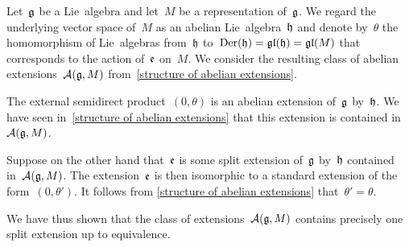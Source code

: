 \begin{remark}
	\label{each class of abelian extensions contains precisely one split extension}
	Let~$\mathfrak{g}$ be a Lie~algebra and let~$M$ be a representation of~$\mathfrak{g}$.
	We regard the underlying vector space of~$M$ as an abelian Lie~algebra~$\mathfrak{h}$ and denote by~$\theta$ the homomorphism of Lie~algebras from~$\mathfrak{h}$ to~$\operatorname{Der}(\mathfrak{h}) = \mathfrak{gl}(\mathfrak{h}) = \mathfrak{gl}(M)$ that corresponds to the action of~$\mathfrak{e}$ on~$M$.
	We consider the resulting class of abelian extensions~$\mathcal{A}(\mathfrak{g}, M)$ from~\cref{structure of abelian extensions}.

	The external semidirect product~$(0,\theta)$ is an abelian extension of~$\mathfrak{g}$ by~$\mathfrak{h}$.
	We have seen in~\cref{structure of abelian extensions} that this extension is contained in~$\mathcal{A}(\mathfrak{g}, M)$.

	Suppose on the other hand that~$\mathfrak{e}$ is some split extension of~$\mathfrak{g}$ by~$\mathfrak{h}$ contained in~$\mathcal{A}(\mathfrak{g}, M)$.
	The extension~$\mathfrak{e}$ is then isomorphic to a standard extension of the form~$(0, \theta')$.
	It follows from \cref{structure of abelian extensions} that~$\theta' = \theta$.

	We have thus shown that the class of extensions~$\mathcal{A}(\mathfrak{g}, M)$ contains precisely one split extension up to equivalence.
\end{remark}





